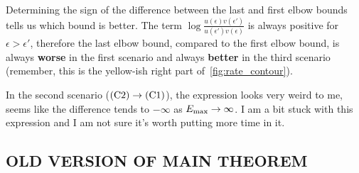 Determining the sign of the difference between the last and first elbow bounds tells us which bound is better.
The term $\log{\frac{u(\epsilon)v(\epsilon')}{u(\epsilon')v(\epsilon)}}$ is always positive for $\epsilon > \epsilon'$, therefore the last elbow bound, compared to the first elbow bound, is always \textbf{worse} in the first scenario and always \textbf{better} in the third scenario (remember, this is the yellow-ish right part of~\cref{fig:rate_contour}).

In the second scenario ($\rm{(C2)} \rightarrow \rm{(C1)}$), the expression looks very weird to me, seems like the difference tends to $-\infty$ as $E_{\rm{max}} \rightarrow \infty$.
I am a bit stuck with this expression and I am not sure it's worth putting more time in it.

\subsection{OLD VERSION OF MAIN THEOREM}



